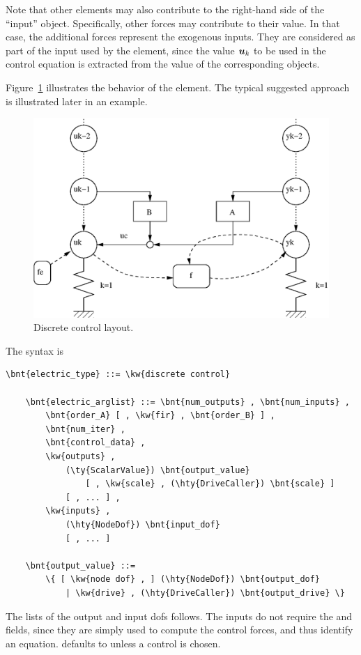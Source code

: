 Note that other elements may also contribute to the right-hand side
of the ``input''  object.
Specifically, other  forces may contribute to their value.
In that case, the additional forces represent the exogenous inputs.
They are considered as part of the input used by the 
element, since the value $\boldsymbol{u}_k$ to be used in the control equation
is extracted from the value of the corresponding  objects.

Figure~\ref{fig:discctrl} illustrates the behavior of the element.
The typical suggested approach is illustrated later in an example.
\begin{figure}
\centering
{}
\includegraphics[width=.7\textwidth]{discctrl}
\caption{Discrete control layout.}
\label{fig:discctrl}
\end{figure}

The syntax is
\begin{Verbatim}[commandchars=\\\{\}]
    \bnt{electric_type} ::= \kw{discrete control}

    \bnt{electric_arglist} ::= \bnt{num_outputs} , \bnt{num_inputs} ,
        \bnt{order_A} [ , \kw{fir} , \bnt{order_B} ] ,
        \bnt{num_iter} ,
        \bnt{control_data} , 
        \kw{outputs} ,
            (\ty{ScalarValue}) \bnt{output_value}
                [ , \kw{scale} , (\hty{DriveCaller}) \bnt{scale} ]
            [ , ... ] ,
        \kw{inputs} ,
            (\hty{NodeDof}) \bnt{input_dof}
            [ , ... ]

    \bnt{output_value} ::=
        \{ [ \kw{node dof} , ] (\hty{NodeDof}) \bnt{output_dof}
            | \kw{drive} , (\hty{DriveCaller}) \bnt{output_drive} \}
\end{Verbatim}
The lists of the output and input dofs follows. The inputs
do not require the  and  fields,
since they are simply used to compute the control forces,
and thus identify an equation.
 defaults to  unless a  control is chosen.

